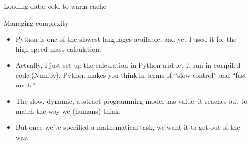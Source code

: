 \documentclass[aspectratio=169]{beamer}
\begin{document}
\begin{frame}{Loading data: cold to warm cache}
\vspace{0.25 cm}
\begin{center}
\end{center}
\end{frame}

\begin{frame}{Managing complexity}
\vspace{0.5 cm}
\begin{itemize}\setlength{\itemsep}{0.4 cm}
\item Python is one of the slowest languages available, and yet I used it for the high-speed mass calculation.
\item<2-> Actually, I just set up the calculation in Python and let it run in compiled code (Numpy). Python makes you think in terms of ``slow control'' and ``fast math.''
\item<3-> The slow, dynamic, abstract programming model has value: it reaches out to match the way we (humans) think.
\item<4-> But once we've specified a mathematical task, we want it to get out of the way.
\end{itemize}
\end{frame}
\end{document}
